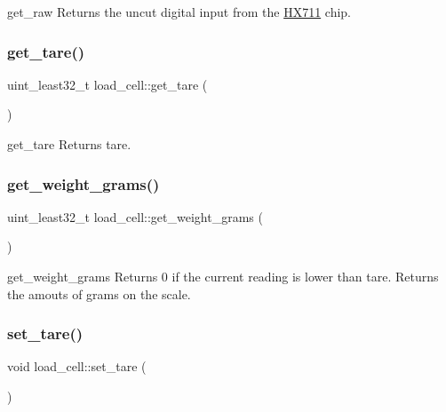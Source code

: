 get\+\_\+raw Returns the uncut digital input from the \hyperlink{class_h_x711}{H\+X711} chip. 

\mbox{\label{classload__cell_a98f7445e717e9e7e07926c4a11a726cf}} 
\subsubsection{\texorpdfstring{get\+\_\+tare()}{get\_tare()}}
{\footnotesize\ttfamily uint\+\_\+least32\+\_\+t load\+\_\+cell\+::get\+\_\+tare (\begin{DoxyParamCaption}{ }\end{DoxyParamCaption})}



get\+\_\+tare Returns tare. 

\mbox{\label{classload__cell_a60bd12b615cc95061a3ae7f62bf816e3}} 
\subsubsection{\texorpdfstring{get\+\_\+weight\+\_\+grams()}{get\_weight\_grams()}}
{\footnotesize\ttfamily uint\+\_\+least32\+\_\+t load\+\_\+cell\+::get\+\_\+weight\+\_\+grams (\begin{DoxyParamCaption}{ }\end{DoxyParamCaption})}



get\+\_\+weight\+\_\+grams Returns 0 if the current reading is lower than tare. Returns the amouts of grams on the scale. 

\mbox{\label{classload__cell_a39e51be89a5ea75144696b203719d970}} 
\subsubsection{\texorpdfstring{set\+\_\+tare()}{set\_tare()}}
{\footnotesize\ttfamily void load\+\_\+cell\+::set\+\_\+tare (\begin{DoxyParamCaption}{ }\end{DoxyParamCaption})}



